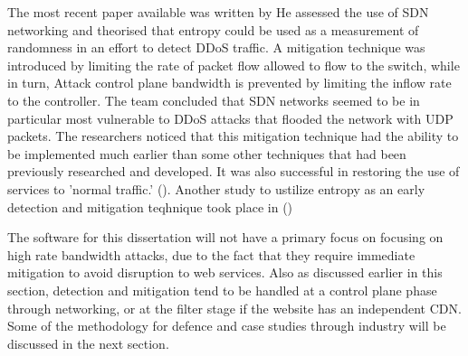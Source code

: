 The most recent paper available was written by \citeauthor{ahalawat2019entropy} He assessed the use of SDN networking and theorised that entropy could be used as a measurement of randomness in an effort to detect DDoS traffic. A mitigation technique was introduced by limiting the rate of packet flow allowed to flow to the switch, while in turn, Attack control plane bandwidth is prevented by limiting the inflow rate to the controller.  The team concluded that SDN networks seemed to be in particular most vulnerable to DDoS attacks that flooded the network with UDP packets. The researchers noticed that this mitigation technique had the ability to be implemented much earlier than some other techniques that had been previously researched and developed. It was also successful in restoring the use of services to 'normal traffic.' (\cite{ahalawat2019entropy}). Another study to ustilize entropy as an early detection and mitigation teqhnique took place in \citeyear{kumar2018safety}  (\cite{kumar2018safety}) 

The software for this dissertation will not have a primary focus on focusing on high rate bandwidth attacks, due to the fact that they require immediate mitigation to avoid disruption to web services. Also as discussed earlier in this section, detection and mitigation tend to be handled at a control plane phase through networking, or at the filter stage if the website has an independent CDN. Some of the methodology for defence and case studies through industry will be discussed in the next section.